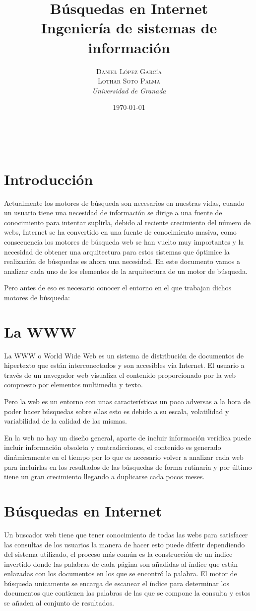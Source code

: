 \documentclass[a4paper, 11pt]{article} %
\title{\textbf{Búsquedas en Internet}\\ %
\vspace{20 pt}
Ingeniería de sistemas de información} %
\author{\textsc{Daniel López García\\
Lothar Soto Palma} %
\\{\textit{Universidad de Granada}}} %
\date{\today} %
\makeatletter
\renewcommand{\maketitle}{ %
\begin{center} %
{\Huge\@title} %
\end{center}

\vspace{20pt} %

\begin{flushright} %
{\large\@author} %
\\\@date %

\vspace{40pt} %
\end{flushright}
\renewcommand{\baselinestretch}{0.5}

}
\makeatother
\begin{document}
	\maketitle
	\tableofcontents
	\listoffigures
	\newpage

	\section{Introducción}
	Actualmente los motores de búsqueda son necesarios en nuestras vidas, cuando un usuario tiene una necesidad de información se dirige a una fuente de conocimiento para intentar suplirla, debido al reciente crecimiento del número de webs, Internet se ha convertido en una fuente de conocimiento masiva, como consecuencia los motores de búsqueda web se han vuelto muy importantes y la necesidad de obtener una arquitectura para estos sistemas que óptimice la realización de búsquedas es ahora una necesidad. En este documento vamos a analizar cada uno de los elementos de la arquitectura de un motor de búsqueda.

	Pero antes de eso es necesario conocer el entorno en el que trabajan dichos motores de búsqueda:
	\section{La WWW}
	La WWW o World Wide Web es un sistema de distribución de documentos de hipertexto que están interconectados y son accesibles vía Internet. El usuario a través de un navegador web visualiza el contenido proporcionado por la web compuesto por elementos multimedia y texto.

	Pero la web es un entorno con unas características un poco adversas a la hora de poder hacer búsquedas sobre ellas esto es debido a su escala, volatilidad y variabilidad de la calidad de las mismas.

	En la web no hay un diseño general, aparte de incluir información verídica puede incluir información obsoleta y contradicciones, el contenido es generado dinámicamente en el tiempo por lo que es necesario volver a analizar cada web para incluirlas en los resultados de las búsquedas de forma rutinaria y por último tiene un gran crecimiento llegando a duplicarse cada pocos meses.

	\section{Búsquedas en Internet}
	Un buscador web tiene que tener conocimiento de todas las webs para satisfacer las consultas de los usuarios la manera de hacer esto puede diferir dependiendo del sistema utilizado, el proceso más común es la construcción de un índice invertido donde las palabras de cada página son añadidas al índice que están enlazadas con los documentos en los que se encontró la palabra. El motor de búsqueda unicamente se encarga de escanear el índice para determinar los documentos que contienen las palabras de las que se compone la consulta y estos se añaden al conjunto de resultados.
\end{document}
